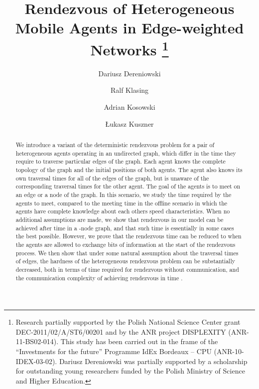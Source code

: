 \documentclass{llncs}
\begin{document}
\pagestyle{headings}  
\title{Rendezvous of Heterogeneous Mobile Agents in Edge-weighted Networks
\thanks{Research partially supported by the Polish National Science Center grant DEC-2011/02/A/ST6/00201
and by the ANR project DISPLEXITY (ANR-11-BS02-014). 
This study has been carried out in the frame of the ``Investments for 
the future'' Programme IdEx Bordeaux – CPU (ANR-10-IDEX-03-02).
Dariusz Dereniowski was partially supported by a scholarship for outstanding young researchers funded by the Polish Ministry of Science and Higher Education.}}


\author{Dariusz Dereniowski\and 
Ralf Klasing\and 
Adrian Kosowski 
\and
{\L}ukasz Kuszner}

 \maketitle

\begin{abstract}
We introduce a variant of the deterministic rendezvous problem for a 
pair of heterogeneous agents operating in an undirected graph, which 
differ in the time they require to traverse particular edges of the 
graph. Each agent knows the complete topology of the graph and 
the initial positions of both agents. The agent also knows its 
own traversal times for all of the edges of the graph, but is unaware of 
the corresponding traversal times for the other agent. The goal of the 
agents is to meet on an edge or a node of the graph. In this scenario, we 
study the time required by the agents to meet, compared to the meeting 
time  in the offline scenario in which the agents have complete 
knowledge about each others speed characteristics. When no additional 
assumptions are made, we show that rendezvous in our model can be 
achieved after time  in a -node graph, and that such 
time is essentially in some cases the best possible. However, we prove 
that the rendezvous time can be reduced to  when the 
agents are allowed to exchange  bits of information at the 
start of the rendezvous process. We then show that under some natural 
assumption about the traversal times of edges, the hardness of the 
heterogeneous rendezvous problem can be substantially decreased, both in 
terms of time required for rendezvous without communication, and the 
communication complexity of achieving rendezvous in time .
\end{abstract}
\end{document}
